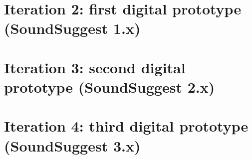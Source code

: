 \section{Iteration 2: first digital prototype (SoundSuggest 1.x)}\label{chapter:prototype:section:soundsuggest1}




\section{Iteration 3: second digital prototype (SoundSuggest 2.x)}\label{chapter:prototype:section:soundsuggest2}




\section{Iteration 4: third digital prototype (SoundSuggest 3.x)}\label{chapter:prototype:section:soundsuggest3}





